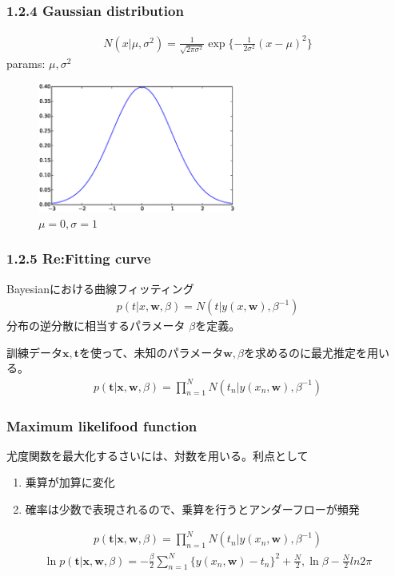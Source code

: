\documentclass[dvipdfmx]{beamer}
\theoremstyle{definition}
\begin{document}
\begin{frame}
  \frametitle{1.2.4 Gaussian distribution}
  \begin{gather*}
    N(x|\mu, \sigma^2) = \frac{1}{\sqrt{2\pi \sigma^2}}\exp\{-\frac{1}{2\sigma^2}(x-\mu)^2 \}
  \end{gather*}
  params: $\mu,\sigma^2$
  \begin{figure}[htb]
    \centering
    \includegraphics[width=6.5cm,clip]{res/gasussiandist.eps}
    \caption{$\mu =0,\sigma=1$}
  \end{figure}
\end{frame}

\begin{frame}
  \frametitle{1.2.5 Re:Fitting curve}
  Bayesianにおける曲線フィッティング
  \begin{gather*}
    p(t|x,\bm{w},\beta)=N(t|y(x,\bm{w}),\beta^{-1})
  \end{gather*}
  分布の逆分散に相当するパラメータ $\beta$を定義。
  
  訓練データ${\bm{x},\bm{t}}$を使って、未知のパラメータ$\bm{w},\beta$を求めるのに最尤推定を用いる。
  \begin{gather*}
    p(\bm{t}|\bm{x},\bm{w},\beta)=\prod_{n=1}^{N} N(t_n | y(x_n,\bm{w}),\beta^{-1})
  \end{gather*}
\end{frame}

\begin{frame}
  \frametitle{Maximum likelifood function}
  尤度関数を最大化するさいには、対数を用いる。利点として
  \begin{enumerate}
    \item 乗算が加算に変化
    \item 確率は少数で表現されるので、乗算を行うとアンダーフローが頻発
  \end{enumerate}
  \begin{gather*}
    p(\bm{t}|\bm{x},\bm{w},\beta)=\prod_{n=1}^{N} N(t_n | y(x_n,\bm{w}),\beta^{-1})
  \end{gather*}
  \begin{gather*}
    \ln{p(\bm{t}|\bm{x},\bm{w},\beta)} = -\frac{\beta}{2}\sum_{n=1}^{N} \{ y(x_n,\bm{w}) - t_n \}^2 + \frac{N}{2},\ln{\beta} -\frac{N}{2}ln{2\pi}
  \end{gather*}
\end{frame}
\end{document}
